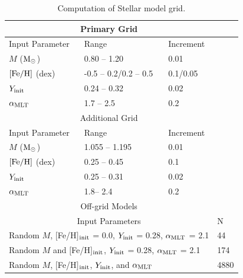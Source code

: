 \begin{table}
	\centering
	\caption{Computation of Stellar model grid.}
	\label{tab:grid}
	\begin{tabular}{llll} %
		\hline
		\multicolumn{3}{c}{Primary Grid}\\
		\hline
		Input Parameter & Range & Increment \\
        \hline
	$M$ ($\rm M_{\odot}$) & 0.80 -- 1.20 &  0.01\\
        $\rm{[Fe/H]}$ (dex) & -0.5 -- 0.2/0.2 -- 0.5 & 0.1/0.05\\
        	$Y_{\rm init}$ & 0.24 -- 0.32 & 0.02\\
        $\alpha_{\rm{MLT}}$  & 1.7 -- 2.5&  0.2\\
        \hline
       \multicolumn{3}{c}{Additional Grid}\\
	\hline
	Input Parameter & Range & Increment \\
        \hline
	$M$ ($\rm M_{\odot}$)  & 1.055 -- 1.195 &  0.01\\
        $\rm{[Fe/H]}$ (dex) & 0.25 -- 0.45 & 0.1\\
        	$Y_{\rm init}$ & 0.25 -- 0.31 & 0.02\\
        $\alpha_{\rm{MLT}}$  & 1.8-- 2.4&  0.2\\
        \hline
        \multicolumn{3}{c}{Off-grid Models}\\
        \hline
        \multicolumn{3}{c}{Input Parameters} &N\\
        \hline
         \multicolumn{3}{l}{Random $M$, [Fe/H]$_{\rm init}$ = 0.0, $Y_{\rm init}$ = 0.28, $\alpha_{\rm MLT}$ = 2.1 } & 44\\
        \multicolumn{3}{l}{Random $M$ and [Fe/H]$_{\rm init}$, $Y_{\rm init}$ = 0.28, $\alpha_{\rm MLT}$ = 2.1 }&174\\
        \multicolumn{3}{l}{Random $M$, [Fe/H]$_{\rm init}$, $Y_{\rm init}$, and $\alpha_{\rm MLT}$}&4880\\
	\hline
	\end{tabular}
\end{table}


